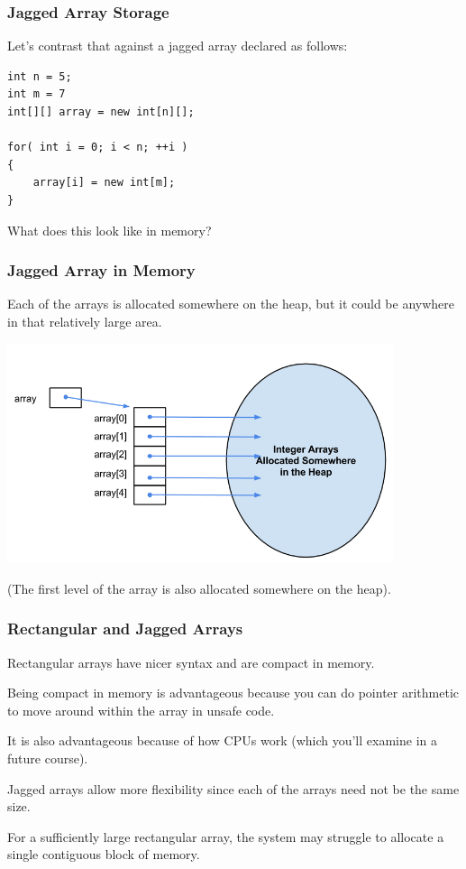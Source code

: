 \begin{frame}[fragile]
\frametitle{Jagged Array Storage}
Let's contrast that against a jagged array declared as follows:\\

\begin{verbatim}
int n = 5;
int m = 7
int[][] array = new int[n][];

for( int i = 0; i < n; ++i )
{
    array[i] = new int[m];
}
\end{verbatim}

What does this look like in memory?

\end{frame}

\begin{frame}
\frametitle{Jagged Array in Memory}

Each of the arrays is allocated somewhere on the heap, but it could be anywhere in that relatively large area.

\begin{center}
	\includegraphics[width=0.85\textwidth]{images/jaggedArrayMemory.png}
\end{center}

(The first level of the array is also allocated somewhere on the heap).


\end{frame}

\begin{frame}
\frametitle{Rectangular and Jagged Arrays}

Rectangular arrays have nicer syntax and are compact in memory.

Being compact in memory is advantageous because you can do pointer arithmetic to move around within the array in unsafe code.

It is also advantageous because of how CPUs work (which you'll examine in a future course).

Jagged arrays allow more flexibility since each of the arrays need not be the same size.

For a sufficiently large rectangular array, the system may struggle to allocate a single contiguous block of memory.

\end{frame}


